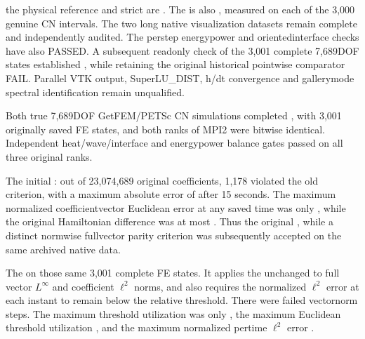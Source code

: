 \documentclass[letterpaper,10pt,english]{sphinxmanual}
\begin{document}
\sphinxAtStartPar
{}
the physical reference and strict
are . The  is also
, measured on each of the
3,000 genuine CN intervals.
The two long native visualization
datasets remain complete and
independently audited.
The  per\sphinxhyphen{}step
energy\sphinxhyphen{}power and oriented\sphinxhyphen{}interface
checks have also PASSED.
A subsequent read\sphinxhyphen{}only check of the 3,001
complete 7,689\sphinxhyphen{}DOF states established
, while retaining the original
historical pointwise comparator FAIL.
Parallel VTK output, SuperLU\_DIST,
h/dt convergence and gallery\sphinxhyphen{}mode
spectral identification remain unqualified.

\sphinxAtStartPar
{}
Both true 7,689\sphinxhyphen{}DOF GetFEM/PETSc CN simulations
completed , with 3,001
originally saved FE states, and both ranks of
MPI2 were bitwise identical. Independent
heat/wave/interface and energy\sphinxhyphen{}power balance
gates passed on all three original ranks.

\sphinxAtStartPar
The initial : out of 23,074,689
original coefficients, 1,178 violated the
old 
criterion, with a maximum absolute error of
 after 15 seconds. The
maximum normalized coefficient\sphinxhyphen{}vector
Euclidean error at any saved time was only
, while the original
Hamiltonian difference was at most
. Thus the original , while a distinct
normwise full\sphinxhyphen{}vector parity criterion
was subsequently accepted on the
same archived native data.

\sphinxAtStartPar
The 
on those same 3,001 complete FE states.
It applies the unchanged 
 to full vector
\(L^\infty\) and coefficient
\(\ell^2\) norms, and also requires
the normalized \(\ell^2\) error at
each instant to remain below the
relative threshold. There were 
failed vector\sphinxhyphen{}norm steps. The maximum
 threshold utilization was only
, the maximum Euclidean
threshold utilization ,
and the maximum normalized per\sphinxhyphen{}time
\(\ell^2\) error .
\end{document}
